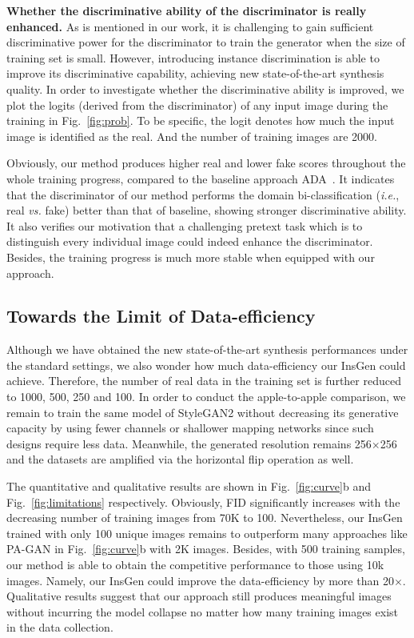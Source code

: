 \documentclass{article}
\begin{document}
\noindent\textbf{Whether the discriminative ability of the discriminator is really enhanced.}
As is mentioned in our work, it is challenging to gain sufficient discriminative power for the discriminator to train the generator when the size of training set is small. However, introducing instance discrimination is able to improve its discriminative capability, achieving new state-of-the-art synthesis quality. In order to investigate whether the discriminative ability is improved, we plot the logits (derived from the discriminator) of any input image during the training in Fig.~\ref{fig:prob}. To be specific, the logit denotes how much the input image is identified as the real. And the number of training images are 2000.


Obviously, our method produces higher real and lower fake scores throughout the whole training progress, compared to the baseline approach ADA~\cite{karras2020training}. It indicates that the discriminator of our method performs the domain bi-classification (\textit{i.e.}, real \textit{vs.} fake) better than that of baseline, showing stronger discriminative ability. It also verifies our motivation that a challenging pretext task which is to distinguish every individual image could indeed enhance the discriminator. Besides, the training progress is much more stable when equipped with our approach.


\subsection{Towards the Limit of Data-efficiency}\label{subsec:limitation}


Although we have obtained the new state-of-the-art synthesis performances under the standard settings, we also wonder how much data-efficiency our InsGen could achieve. Therefore, the number of real data in the training set is further reduced to 1000, 500, 250 and 100. In order to conduct the apple-to-apple comparison, we remain to train the same model of StyleGAN2 without decreasing its generative capacity by using fewer channels or shallower mapping networks since such designs require less data. Meanwhile, the generated resolution remains 256$\times$256 and the datasets are amplified via the horizontal flip operation as well.


The quantitative and qualitative results are shown in Fig.~\ref{fig:curve}b and Fig.~\ref{fig:limitations} respectively.
Obviously, FID significantly increases with the decreasing number of training images from 70K to 100. Nevertheless, our InsGen trained with only 100 unique images remains to outperform many approaches like PA-GAN in Fig.~\ref{fig:curve}b with 2K images.
Besides, with 500 training samples, our method is able to obtain the competitive performance to those using 10k images. Namely, our InsGen could improve the data-efficiency by more than 20$\times$. Qualitative results suggest that our approach still produces meaningful images without incurring the model collapse no matter how many training images exist in the data collection.
\end{document}
